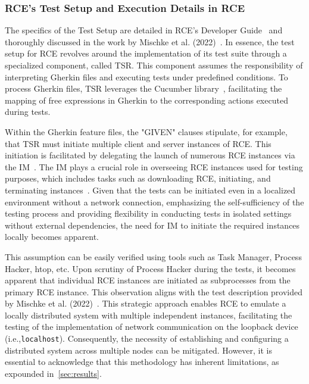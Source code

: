 \subsubsection{\ac{RCE}'s Test Setup and Execution Details in RCE}
The specifics of the Test Setup are detailed in \ac{RCE}'s Developer Guide~\cite{rceDevGuide10x} and thoroughly discussed in the work by Mischke et al. (2022)~\cite{10.1007/978-3-031-08760-8_44}. In essence, the test setup for \ac{RCE} revolves around the implementation of its test suite through a specialized component, called \acf{TSR}. This component assumes the responsibility of interpreting Gherkin files and executing tests under predefined conditions. To process Gherkin files, \ac{TSR} leverages the Cucumber library~\cite{10.1007/978-3-031-08760-8_44}, facilitating the mapping of free expressions in Gherkin to the corresponding actions executed during tests.

Within the Gherkin feature files, the "GIVEN" clauses stipulate, for example, that \ac{TSR} must initiate multiple client and server instances of \ac{RCE}. This initiation is facilitated by delegating the launch of numerous \ac{RCE} instances via the \acf{IM}~\cite{rceDevGuide10x}. 
The \ac{IM} plays a crucial role in overseeing \ac{RCE} instances used for testing purposes, which includes tasks such as downloading \ac{RCE}, initiating, and terminating instances~\cite{10.1007/978-3-031-08760-8_44,rceDevGuide10x}. Given that the tests can be initiated even in a localized environment without a network connection, emphasizing the self-sufficiency of the testing process and providing flexibility in conducting tests in isolated settings without external dependencies, the need for \ac{IM} to initiate the required instances locally becomes apparent.

This assumption can be easily verified using tools such as Task Manager, Process Hacker, htop, etc. Upon scrutiny of Process Hacker during the tests, it becomes apparent that individual \ac{RCE} instances are initiated as subprocesses from the primary \ac{RCE} instance. This observation aligns with the test description provided by Mischke et al. (2022)~\cite{10.1007/978-3-031-08760-8_44}. This strategic approach enables \ac{RCE} to emulate a locally distributed system with multiple independent instances, facilitating the testing of the implementation of network communication on the loopback device (i.e.,\texttt{localhost}). Consequently, the necessity of establishing and configuring a distributed system across multiple nodes can be mitigated. However, it is essential to acknowledge that this methodology has inherent limitations, as expounded in~\cref{sec:results}.

